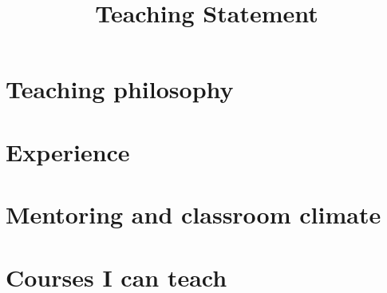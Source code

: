 \documentclass[11pt,letterpaper]{article}
\title{Teaching Statement}
\author{\docauthor}
\date{}
\begin{document}
\maketitle
\thispagestyle{empty}

\section*{Teaching philosophy}

\section*{Experience}

\section*{Mentoring and classroom climate}

\section*{Courses I can teach}
\end{document}
